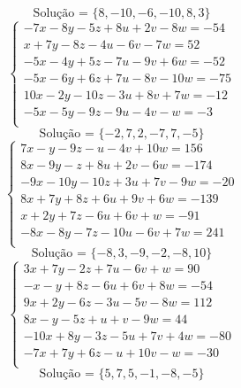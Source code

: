 \documentclass[12pt,oneside,a4paper]{article}
\begin{document}
\begin{equation*}
\text{Solução = }\{8,-10,-6,-10,8,3\}
\end{equation*}
\vspace{\baselineskip}
\begin{equation*}
\begin{cases}
-7x-8y-5z+8u+2v-8w=-54 \\
x+7y-8z-4u-6v-7w=52 \\
-5x-4y+5z-7u-9v+6w=-52 \\
-5x-6y+6z+7u-8v-10w=-75 \\
10x-2y-10z-3u+8v+7w=-12 \\
-5x-5y-9z-9u-4v-w=-3 \\
\end{cases}
\end{equation*}
\begin{equation*}
\text{Solução = }\{-2,7,2,-7,7,-5\}
\end{equation*}
\vspace{\baselineskip}
\begin{equation*}
\begin{cases}
7x-y-9z-u-4v+10w=156 \\
8x-9y-z+8u+2v-6w=-174 \\
-9x-10y-10z+3u+7v-9w=-20 \\
8x+7y+8z+6u+9v+6w=-139 \\
x+2y+7z-6u+6v+w=-91 \\
-8x-8y-7z-10u-6v+7w=241 \\
\end{cases}
\end{equation*}
\begin{equation*}
\text{Solução = }\{-8,3,-9,-2,-8,10\}
\end{equation*}
\vspace{\baselineskip}
\begin{equation*}
\begin{cases}
3x+7y-2z+7u-6v+w=90 \\
-x-y+8z-6u+6v+8w=-54 \\
9x+2y-6z-3u-5v-8w=112 \\
8x-y-5z+u+v-9w=44 \\
-10x+8y-3z-5u+7v+4w=-80 \\
-7x+7y+6z-u+10v-w=-30 \\
\end{cases}
\end{equation*}
\begin{equation*}
\text{Solução = }\{5,7,5,-1,-8,-5\}
\end{equation*}
\end{document}
